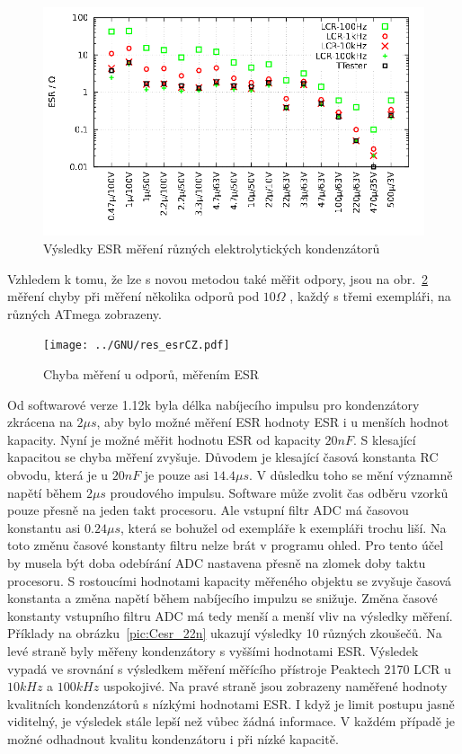 \begin{figure}[H]
\centering
\includegraphics[width=1.\textwidth]{../GNU/Elco_esr.pdf}
\caption{Výsledky ESR měření různých elektrolytických kondenzátorů}
\label{fig:ElcoESR}
\end{figure}

Vzhledem k tomu, že lze s novou metodou také měřit odpory, jsou na obr.~\ref{fig:res_esr} měření chyby při měření několika odporů pod \(10\Omega\) , každý s třemi exempláři, na různých ATmega zobrazeny.  

\begin{figure}[H]
\centering
\texttt{[image: ../GNU/res\_esrCZ.pdf]}
\caption{Chyba měření u odporů, měřením ESR}
\label{fig:res_esr}
\end{figure}

Od softwarové verze 1.12k byla délka nabíjecího impulsu pro kondenzátory zkrácena na \(2\mu s\), aby bylo možné měření ESR hodnoty ESR i u menších hodnot kapacity.
Nyní je možné měřit hodnotu ESR od kapacity \(20nF\).
S klesající kapacitou se chyba měření zvyšuje. Důvodem je klesající časová konstanta RC obvodu, která je u \(20nF\) je pouze asi \(14.4\mu s\).
V důsledku toho se mění významně napětí během \(2\mu s\) proudového impulsu.
Software může zvolit čas odběru vzorků pouze přesně na jeden takt procesoru. Ale vstupní filtr
ADC má časovou konstantu asi \(0.24\mu s\), která se bohužel od exempláře k exempláři trochu liší.
Na toto změnu časové konstanty filtru nelze brát v programu ohled.
Pro tento účel by musela být doba odebírání ADC nastavena přesně na zlomek doby taktu procesoru.
S rostoucími hodnotami kapacity měřeného objektu se zvyšuje časová konstanta a změna napětí během nabíjecího impulzu se snižuje.
Změna časové konstanty vstupního filtru ADC má tedy menší a menší vliv na výsledky měření.
Příklady na obrázku~\ref{pic:Cesr_22n} ukazují výsledky 10 různých zkoušečů.
Na levé straně byly měřeny kondenzátory s vyššími hodnotami ESR. Výsledek vypadá ve srovnání s výsledkem měření měřícího přístroje Peaktech 2170 LCR u \(10kHz\) a \(100kHz\) uspokojivé.
Na pravé straně jsou zobrazeny naměřené hodnoty kvalitních kondenzátorů s nízkými hodnotami ESR.
I když je limit postupu jasně viditelný, je výsledek stále lepší než vůbec žádná informace.
V každém případě je možné odhadnout kvalitu kondenzátoru i při nízké kapacitě.

